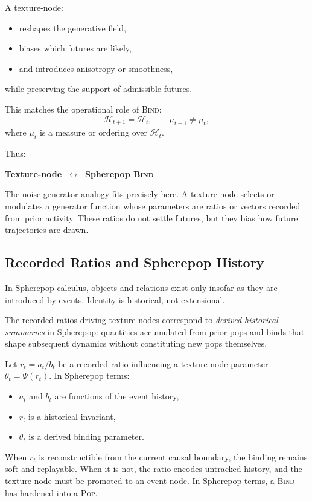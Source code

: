 \documentclass[11pt]{article}
\begin{document}
A texture-node:
\begin{itemize}
\item reshapes the generative field,
\item biases which futures are likely,
\item and introduces anisotropy or smoothness,
\end{itemize}
while preserving the support of admissible futures.

This matches the operational role of \textsc{Bind}:
\begin{equation}
\mathcal{H}_{t+1} = \mathcal{H}_t,
\qquad
\mu_{t+1} \neq \mu_t,
\end{equation}
where $\mu_t$ is a measure or ordering over $\mathcal{H}_t$.

Thus:
\begin{center}
\textbf{Texture-node} $\;\longleftrightarrow\;$ \textbf{Spherepop \textsc{Bind}}
\end{center}

The noise-generator analogy fits precisely here. A texture-node selects or
modulates a generator function whose parameters are ratios or vectors recorded
from prior activity. These ratios do not settle futures, but they bias how
future trajectories are drawn.

\subsection{Recorded Ratios and Spherepop History}

In Spherepop calculus, objects and relations exist only insofar as they are
introduced by events. Identity is historical, not extensional.

The recorded ratios driving texture-nodes correspond to \emph{derived
historical summaries} in Spherepop: quantities accumulated from prior pops and
binds that shape subsequent dynamics without constituting new pops themselves.

Let $r_t = a_t / b_t$ be a recorded ratio influencing a texture-node parameter
$\theta_t = \Psi(r_t)$. In Spherepop terms:
\begin{itemize}
\item $a_t$ and $b_t$ are functions of the event history,
\item $r_t$ is a historical invariant,
\item $\theta_t$ is a derived binding parameter.
\end{itemize}

When $r_t$ is reconstructible from the current causal boundary, the binding
remains soft and replayable. When it is not, the ratio encodes untracked
history, and the texture-node must be promoted to an event-node. In Spherepop
terms, a \textsc{Bind} has hardened into a \textsc{Pop}.
\end{document}
